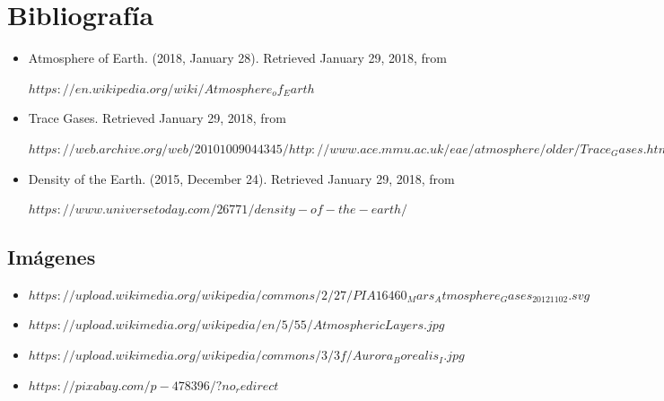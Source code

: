\documentclass{article} %
\begin{document}
\section{Bibliografía}
\begin{itemize}
\item Atmosphere of Earth. (2018, January 28). Retrieved January 29, 2018, from

$https://en.wikipedia.org/wiki/Atmosphere_of_Earth $

\item Trace Gases. Retrieved January 29, 2018, from 

$https://web.archive.org/web/20101009044345/http://www.ace.mmu.ac.uk/eae/atmosphere/older/Trace_Gases.html$

\item Density of the Earth. (2015, December 24). Retrieved January 29, 2018, from 

$https://www.universetoday.com/26771/density-of-the-earth/$
\end{itemize}

\subsection{Imágenes}
\begin{itemize}
\item $https://upload.wikimedia.org/wikipedia/commons/2/27/PIA16460_Mars_Atmosphere_Gases_20121102.svg$
\item $https://upload.wikimedia.org/wikipedia/en/5/55/AtmosphericLayers.jpg$
\item $https://upload.wikimedia.org/wikipedia/commons/3/3f/Aurora_Borealis_I.jpg$
\item $https://pixabay.com/p-478396/?no_redirect$
\end{itemize}
\end{document}
